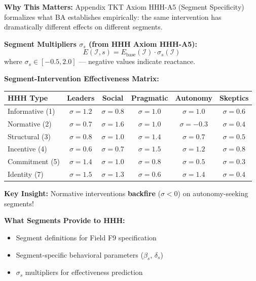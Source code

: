\begin{tcolorbox}[colback=orange!5!white, colframe=orange!75!black,
    title=\textbf{Integration: Segments $\leftrightarrow$ HHH (Intervention Toolkit)}]

\textbf{Why This Matters:}
Appendix TKT Axiom HHH-A5 (Segment Specificity) formalizes what BA establishes empirically:
the same intervention has dramatically different effects on different segments.

\textbf{Segment Multipliers $\sigma_s$ (from HHH Axiom HHH-A5):}
\begin{equation}
E(\mathcal{I}, s) = E_{\text{base}}(\mathcal{I}) \cdot \sigma_s(\mathcal{I})
\end{equation}
where $\sigma_s \in [-0.5, 2.0]$ --- negative values indicate reactance.

\textbf{Segment-Intervention Effectiveness Matrix:}
\begin{center}
\renewcommand{\arraystretch}{1.2}
\footnotesize
\begin{tabular}{@{}lccccc@{}}
\toprule
\textbf{HHH Type} & \textbf{Leaders} & \textbf{Social} & \textbf{Pragmatic} & \textbf{Autonomy} & \textbf{Skeptics} \\
\midrule
Informative (1) & $\sigma=1.2$ & $\sigma=0.8$ & $\sigma=1.0$ & $\sigma=1.0$ & $\sigma=0.6$ \\
Normative (2) & $\sigma=0.7$ & $\sigma=1.6$ & $\sigma=1.0$ & $\sigma=-0.3$ & $\sigma=0.4$ \\
Structural (3) & $\sigma=0.8$ & $\sigma=1.0$ & $\sigma=1.4$ & $\sigma=0.7$ & $\sigma=0.5$ \\
Incentive (4) & $\sigma=0.6$ & $\sigma=0.7$ & $\sigma=1.5$ & $\sigma=1.2$ & $\sigma=0.8$ \\
Commitment (5) & $\sigma=1.4$ & $\sigma=1.0$ & $\sigma=0.8$ & $\sigma=0.5$ & $\sigma=0.3$ \\
Identity (7) & $\sigma=1.5$ & $\sigma=1.3$ & $\sigma=0.6$ & $\sigma=1.4$ & $\sigma=0.4$ \\
\bottomrule
\end{tabular}
\end{center}

\textbf{Key Insight:} Normative interventions \textbf{backfire} ($\sigma < 0$) on autonomy-seeking segments!

\textbf{What Segments Provide to HHH:}
\begin{itemize}[nosep]
\item Segment definitions for Field F9 specification
\item Segment-specific behavioral parameters ($\beta_s$, $\delta_s$)
\item $\sigma_s$ multipliers for effectiveness prediction
\end{itemize}


\end{tcolorbox}
